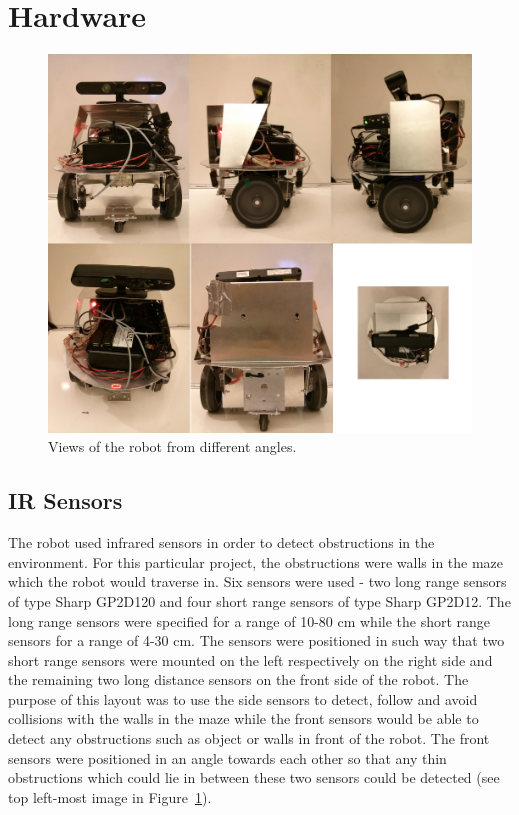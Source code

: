 \section{Hardware}
\begin{figure}
  \centering
  \includegraphics[width=\linewidth]{images/robo_views.png}
  \caption{Views of the robot from different angles.}
  \label{fig:roboview}
\end{figure}
\subsection{IR Sensors}
The robot used infrared sensors in order to detect obstructions in the
environment. For this particular project, the obstructions were walls in the
maze which the robot would traverse in. Six sensors were used - two long range
sensors of type Sharp GP2D120 and four short range sensors of type Sharp GP2D12.
The long range sensors were specified for a range of 10-80 cm while the short
range sensors for a range of 4-30 cm. The sensors were positioned in such way
that two short range sensors were mounted on the left respectively on the right
side and the remaining two long distance sensors on the front side of the robot.
The purpose of this layout was to use the side sensors to detect, follow and
avoid collisions with the walls in the maze while the front sensors would be
able to detect any obstructions such as object or walls in front of the robot.
The front sensors were positioned in an angle towards each other so that any
thin obstructions which could lie in between these two sensors could be detected
(see top left-most image in Figure~\ref{fig:roboview}).

